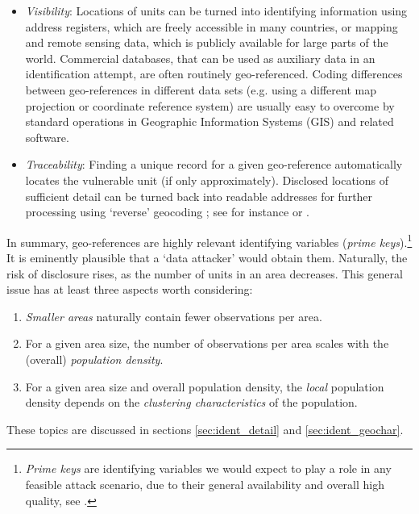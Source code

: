 \begin{itemize}
    \item \emph{Visibility}: Locations of units can be turned into identifying information using address registers, which are freely accessible in many countries, or mapping and remote sensing data, which is publicly available for large parts of the world. Commercial databases, that can be used as auxiliary data in an identification attempt, are often routinely geo-referenced. Coding differences between geo-references in different data sets (e.g. using a different map projection or coordinate reference system) are usually easy to overcome by standard operations in Geographic Information Systems (GIS) and related software.
    \item \emph{Traceability}: Finding a unique record for a given geo-reference automatically locates the vulnerable unit (if only approximately). Disclosed locations of sufficient detail can be turned back into readable addresses for further processing using `reverse' geocoding \citep{OwusuEtAl2017}; see for instance \cite{BrownsteinEtAl2006} or \cite{CurtisEtAl2006}.
\end{itemize}

In summary, geo-references are highly relevant identifying variables (\emph{prime keys}).\footnote{
    \emph{Prime keys} are identifying variables we would expect to play a role in any feasible attack scenario, due to their general availability and overall high quality, see \cite{ElliotDale1999}.} 
It is eminently plausible that a `data attacker' would obtain them. 
Naturally, the risk of disclosure rises, as the number of units in an area decreases. This general issue has at least three aspects worth considering: 
\begin{enumerate}
    \item \emph{Smaller areas} naturally contain fewer observations per area.
    \item For a given area size, the number of observations per area scales with the (overall) \emph{population density}.
    \item For a given area size and overall population density, the \emph{local} population density depends on the \emph{clustering characteristics} of the population.
\end{enumerate}
These topics are discussed in sections \ref{sec:ident_detail} and \ref{sec:ident_geochar}.

